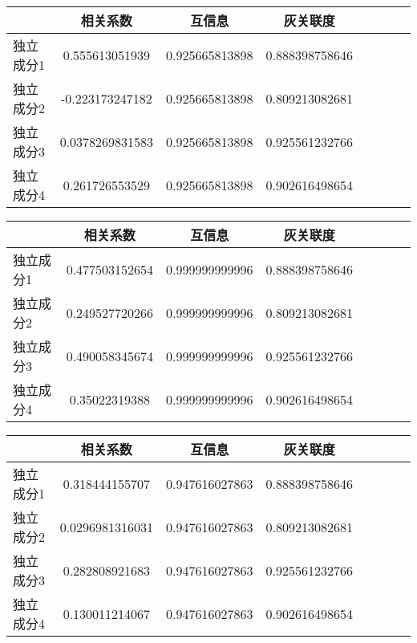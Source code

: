 \begin{table}[!htbp] 
\begin{center}
\begin{tabular}{lccclccc} 
 \toprule 
& 相关系数   & 互信息    &灰关联度 \\ 
\midrule 
独立成分1	& 0.555613051939	& 0.925665813898	& 0.888398758646	\\ 
独立成分2	& -0.223173247182	& 0.925665813898	& 0.809213082681	\\ 
独立成分3	& 0.0378269831583	& 0.925665813898	& 0.925561232766	\\ 
独立成分4	& 0.261726553529	& 0.925665813898	& 0.902616498654	\\ 
\bottomrule 
 \end{tabular} 
\end{center} 
 \end{table} 


\begin{table}[!htbp] 
\begin{center}
\begin{tabular}{lccclccc} 
 \toprule 
& 相关系数   & 互信息    &灰关联度 \\ 
\midrule 
独立成分1	& 0.477503152654	& 0.999999999996	& 0.888398758646	\\ 
独立成分2	& 0.249527720266	& 0.999999999996	& 0.809213082681	\\ 
独立成分3	& 0.490058345674	& 0.999999999996	& 0.925561232766	\\ 
独立成分4	& 0.35022319388	& 0.999999999996	& 0.902616498654	\\ 
\bottomrule 
 \end{tabular} 
\end{center} 
 \end{table} 


\begin{table}[!htbp] 
\begin{center}
\begin{tabular}{lccclccc} 
 \toprule 
& 相关系数   & 互信息    &灰关联度 \\ 
\midrule 
独立成分1	& 0.318444155707	& 0.947616027863	& 0.888398758646	\\ 
独立成分2	& 0.0296981316031	& 0.947616027863	& 0.809213082681	\\ 
独立成分3	& 0.282808921683	& 0.947616027863	& 0.925561232766	\\ 
独立成分4	& 0.130011214067	& 0.947616027863	& 0.902616498654	\\ 
\bottomrule 
 \end{tabular} 
\end{center} 
 \end{table} 


